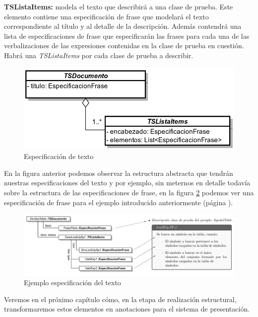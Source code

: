 \medskip
\noindent
\textbf{TSListaItems:} modela el texto que describirá a una clase de prueba. Este elemento contiene una especificación de frase que modelará el texto correspondiente al título y al detalle de la descripción. Además contendrá una lista de especificaciones de frase que especificarán las frases para cada una de las verbalizaciones de las expresiones contenidas en la clase de prueba en cuestión. Habrá una \emph{TSListaItems} por cada clase de prueba a describir.

\begin{figure}[H]
  	\centering
	\includegraphics[scale=0.3]{img/text_spec.png}
	\caption{Especificación de texto}
  	\label{fig:text_spec}
\end{figure}

En la figura anterior podemos observar la estructura abstracta que tendrán nuestras especificaciones del texto y por ejemplo, sin meternos en detalle todavía sobre la estructura de las especificaciones de frase, en la figura \ref{fig:text_spec_ej} podemos ver una especificación de frase para el ejemplo introducido anteriormente (página \pageref{fig:ej_corpus}).

\begin{figure}[H]
  	\centering
	\includegraphics[scale=0.35]{img/ej_text_spec.png}
	\caption{Ejemplo especificación del texto}
  \label{fig:text_spec_ej}
\end{figure}

Veremos en el próximo capítulo cómo, en la etapa de realización estructural, transformaremos estos elementos en anotaciones para el sistema de presentación.

